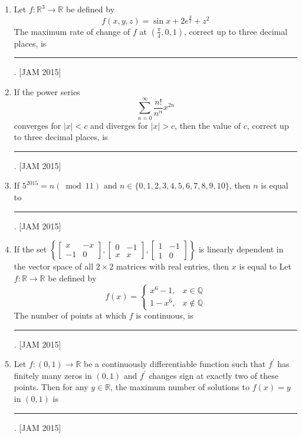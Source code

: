 \begin{enumerate}
\item  Let $f: \mathbb{R}^{3} \rightarrow \mathbb{R}$ be defined by
$$
f(x, y, z)=\sin x+2 e^{\frac{y}{2}}+z^{2}
$$
The maximum rate of change of $f$ at $\left(\frac{\pi}{4}, 0,1\right)$, correct up to three decimal places, is \rule{3cm}{1pt}.
\hfill [JAM 2015]



\item  

If the power series
$$
\sum_{n=0}^{\infty} \frac{n !}{n^{n}} x^{2 n}
$$
converges for $|x|<c$ and diverges for $|x|>c$, then the value of $c$, correct up to three decimal places, is \rule{3cm}{1pt}.
\hfill [JAM 2015]




\item  If $5^{2015}=n(\bmod 11)$ and $n \in\{0,1,2,3,4,5,6,7,8,9,10\}$, then $n$ is equal to \rule{3cm}{1pt}.
\hfill [JAM 2015]




\item  If the set $\left\{\left[\begin{array}{cc}x & -x \\ -1 & 0\end{array}\right],\left[\begin{array}{cc}0 & -1 \\ x & x\end{array}\right],\left[\begin{array}{cc}1 & -1 \\ 1 & 0\end{array}\right]\right\}$ is linearly dependent in the vector space of all $2 \times 2$ matrices with real entries, then $x$ is equal to Let $f: \mathbb{R} \rightarrow \mathbb{R}$ be defined by
$$
f(x)= \begin{cases}x^{6}-1, & x \in \mathbb{Q} \\ 1-x^{6}, & x \notin \mathbb{Q}\end{cases}
$$
The number of points at which $f$ is continuous, is \rule{3cm}{1pt}.
\hfill [JAM 2015]



\item  

Let $f:(0,1) \rightarrow \mathbb{R}$ be a continuously differentiable function such that $f^{\prime}$ has finitely many zeros in $(0,1)$ and $f^{\prime}$ changes sign at exactly two of these points. Then for any $y \in \mathbb{R}$, the maximum number of solutions to $f(x)=y$ in $(0,1)$ is \rule{3cm}{1pt}.
\hfill [JAM 2015]




\end{enumerate}
